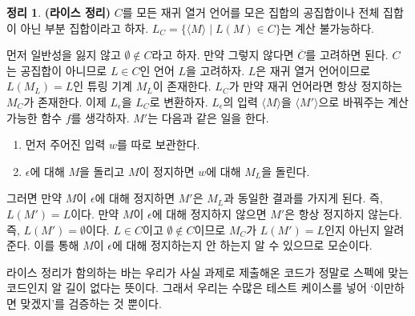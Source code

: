 \documentclass[b5paper, 11pt]{book}
\theoremstyle{definition}
\newtheorem{thm}[defn]{정리}
\newenvironment{pf*}{\pushQED{\qed}\pf}
{\popQED\endpf}
\begin{document}
\begin{thm}
    \textbf{(라이스 정리)} $C$를 모든 재귀 열거 언어를 모은 집합의 공집합이나 
    전체 집합이 아닌 부분 집합이라고 하자. $L_C = \{ \langle M \rangle \; \vert 
    \; L(M) \in C\}$는 계산 불가능하다. 
\end{thm}
\begin{pf*}
    먼저 일반성을 잃지 않고 $\emptyset \notin C$라고 하자. 만약 그렇지 않다면 $\overline{C}$를 고려하면 된다. $C$는 공집합이 아니므로 $L\in C$인 언어 $L$을 고려하자. $L$은 재귀 열거 언어이므로 $L(M_L) = L$인 튜링 기계 $M_L$이 존재한다. $L_C$가 만약 재귀 언어라면 항상 정지하는 $M_C$가 존재한다. 이제 $L_\epsilon$을 $L_C$로 변환하자. $L_\epsilon$의 입력  $\langle M \rangle$을 $\langle M' \rangle$으로 바꿔주는 계산 가능한 함수 $f$를 생각하자. $M'$는 다음과 같은 일을 한다.
    \begin{enumerate}
        \item 먼저 주어진 입력 $w$를 따로 보관한다.
        \item $\epsilon$에 대해 $M$을 돌리고 $M$이 정지하면 $w$에 대해 $M_L$을 돌린다.
    \end{enumerate}
    그러면 만약 $M$이 $\epsilon$에 대해 정지하면 $M'$은 $M_L$과 동일한 결과를 가지게 된다. 즉, $L(M') = L$이다. 만약 $M$이 $\epsilon$에 대해 정지하지 않으면 $M'$은 항상 정지하지 않는다. 즉, $L(M') = \emptyset$이다. $L \in C$이고 $\emptyset \notin C$이므로 $M_C$가 $L(M') = L$인지 아닌지 알려준다. 이를 통해 $M$이 $\epsilon$에 대해 정지하는지 안 하는지 알 수 있으므로 모순이다.
\end{pf*}
라이스 정리가 함의하는 바는 우리가 사실 과제로 제출해온 코드가 정말로 스펙에 맞는 코드인지 알 길이 없다는 뜻이다. 그래서 우리는 수많은 테스트 케이스를 넣어 `이만하면 맞겠지'를 검증하는 것 뿐이다.
\end{document}
